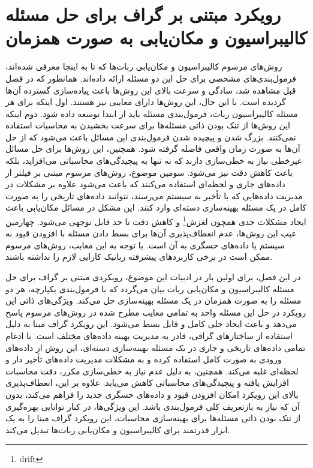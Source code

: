 \section{رویکرد مبتنی بر گراف برای حل مسئله کالیبراسیون و مکان‌یابی به صورت همزمان}
روش‌های مرسوم کالیبراسیون و مکان‌یابی ربات‌ها که تا به اینجا معرفی شده‌اند، فرمول‌بندی‌های مشخصی برای حل این دو مسئله ارائه داده‌اند. همانطور که در فصل قبل مشاهده شد، سادگی و سرعت بالای این روش‌ها باعث پیاده‌سازی گسترده آن‌ها گردیده است. با این حال، این روش‌ها دارای معایبی نیز هستند. 
اول اینکه برای هر مسئله کالیبراسیون ربات، فرمول‌بندی مسئله باید از ابتدا توسعه داده شود. دوم اینکه  این روش‌ها از تنک بودن ذاتی مسئله‌ها برای سرعت بخشیدن به محاسبات استفاده نمی‌کنند. بزرگ شدن و پیچیده شدن فرمول‌بندی این مسائل باعث می‌شود که از حل آن‌ها به صورت زمان واقعی فاصله گرفته شود.  همچنین، این روش‌ها برای حل مسائل غیرخطی نیاز به خطی‌سازی دارند که نه تنها به پیچیدگی‌های محاسباتی می‌افزاید، بلکه باعث کاهش دقت نیز می‌شود. 
سومین موضوع، روش‌های مرسوم مبتنی بر فیلتر از داده‌های جاری و لحظه‌ای استفاده می‌کنند که باعث می‌شود علاوه بر مشکلات در مدیریت داده‌هایی که با تأخیر به سیستم می‌رسند، نتوانند داده‌های تاریخی را به صورت کامل در یک مسئله بهینه‌سازی دسته‌ای وارد کنند. این مشکل در مسائل مکان‌یابی باعث ایجاد مشکلات جدی همچون لغزش\footnote{drift}
و کاهش دقت تا حد قابل توجهی می‌شود. چهارمین عیب این روش‌ها، عدم انعطاف‌پذیری آن‌ها برای بسط دادن مسئله با افزودن قیود به سیستم یا داده‌های حسگری به آن است. با توجه به این معایب، روش‌های مرسوم ممکن است در برخی کاربردهای پیشرفته رباتیک کارایی لازم را نداشته باشند. 

در این فصل، برای اولین بار در ادبیات این موضوع، رویکردی مبتنی بر گراف برای حل مسئله کالیبراسیون و مکان‌یابی ربات بیان می‌گردد که با فرمول‌بندی یکپارچه، هر دو مسئله را به صورت همزمان در یک مسئله بهینه‌سازی حل می‌کند. ویژگی‌های ذاتی این رویکرد در حل این مسئله واحد به تمامی معایب مطرح شده در روش‌های مرسوم پاسخ می‌دهد و باعث ایجاد حلی کامل و قابل بسط می‌شود. این رویکرد گراف مبنا به دلیل استفاده از ساختارهای گرافی، قادر به مدیریت بهینه‌ داده‌های مختلف است. با ادغام تمامی داده‌های تاریخی و جاری در یک مسئله بهینه‌سازی دسته‌ای، این روش از داده‌های ورودی به صورت کامل استفاده کرده و به مشکلات مدیریت داده‌های تأخیر دار و لحظه‌ای غلبه می‌کند. همچنین، به دلیل عدم نیاز به خطی‌سازی مکرر، دقت محاسبات افزایش یافته و پیچیدگی‌های محاسباتی کاهش می‌یابد. علاوه بر این، انعطاف‌پذیری بالای این رویکرد امکان افزودن قیود و داده‌های حسگری جدید را فراهم می‌کند، بدون آن که نیاز به بازتعریف کلی فرمول‌بندی باشد. این ویژگی‌ها، در کنار توانایی بهره‌گیری از تنک بودن ذاتی مسئله‌ها برای بهینه‌سازی محاسبات، این رویکرد گراف مبنا را به یک ابزار قدرتمند برای کالیبراسیون و مکان‌یابی ربات‌ها تبدیل می‌کند.

